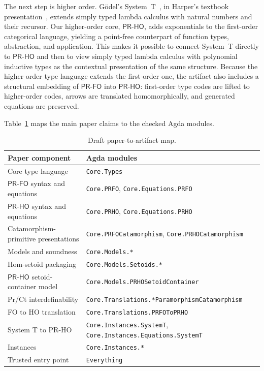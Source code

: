 \documentclass[sigplan,10pt,anonymous,review,screen]{acmart}
\newcommand{\PRFO}{\ensuremath{\mathsf{PR\mbox{-}FO}}}
\newcommand{\PRHO}{\ensuremath{\mathsf{PR\mbox{-}HO}}}
\newcommand{\AgdaFile}[1]{\texttt{#1}}
\begin{document}
The next step is higher order.  G\"odel's System~T~\cite{goedel58}, in
Harper's textbook presentation~\cite[Chapter~9]{DBLP:books/cu/Ha2016},
extends simply typed lambda calculus with natural numbers and their
recursor.  Our higher-order core, \PRHO{}, adds
exponentials to the first-order categorical language, yielding a
point-free counterpart of function types, abstraction, and application.
This makes it possible to connect System~T directly to \PRHO{} and then
to view simply typed lambda calculus with polynomial inductive types as
the contextual presentation of the same structure.
Because the higher-order type language extends the first-order one, the
artifact also includes a structural embedding of \PRFO{} into \PRHO{}:
first-order type codes are lifted to higher-order codes, arrows are
translated homomorphically, and generated equations are preserved.

Table~\ref{tab:artifact-map} maps the main paper claims to the checked
Agda modules.

\begin{table}
\centering
\begin{tabular}{ll}
\toprule
Paper component & Agda modules \\
\midrule
Core type language & \AgdaFile{Core.Types} \\
\PRFO{} syntax and equations & \AgdaFile{Core.PRFO}, \AgdaFile{Core.Equations.PRFO} \\
\PRHO{} syntax and equations & \AgdaFile{Core.PRHO}, \AgdaFile{Core.Equations.PRHO} \\
Catamorphism-primitive presentations & \AgdaFile{Core.PRFOCatamorphism}, \AgdaFile{Core.PRHOCatamorphism} \\
Models and soundness & \AgdaFile{Core.Models.*} \\
Hom-setoid packaging & \AgdaFile{Core.Models.Setoids.*} \\
\PRHO{} setoid-container model & \AgdaFile{Core.Models.PRHOSetoidContainer} \\
Pr/Ct interdefinability & \AgdaFile{Core.Translations.*ParamorphismCatamorphism} \\
FO to HO translation & \AgdaFile{Core.Translations.PRFOToPRHO} \\
System T to PR-HO & \AgdaFile{Core.Instances.SystemT},
  \AgdaFile{Core.Instances.Equations.SystemT} \\
Instances & \AgdaFile{Core.Instances.*} \\
Trusted entry point & \AgdaFile{Everything} \\
\bottomrule
\end{tabular}
\caption{Draft paper-to-artifact map.}
\label{tab:artifact-map}
\end{table}
\end{document}
